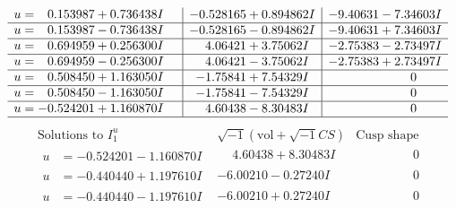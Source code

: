 \documentclass[1p]{elsarticle_modified}
\theoremstyle{definition}
\newcommand{\I}{\sqrt{-1}}
\begin{document}
$$\begin{array}{c|c|c}
\begin{aligned}
u &= \phantom{-}0.153987 + 0.736438 I\end{aligned}
 & -0.528165 + 0.894862 I & -9.40631 - 7.34603 I \\ \hline\begin{aligned}
u &= \phantom{-}0.153987 - 0.736438 I\end{aligned}
 & -0.528165 - 0.894862 I & -9.40631 + 7.34603 I \\ \hline\begin{aligned}
u &= \phantom{-}0.694959 + 0.256300 I\end{aligned}
 & \phantom{-}4.06421 + 3.75062 I & -2.75383 - 2.73497 I \\ \hline\begin{aligned}
u &= \phantom{-}0.694959 - 0.256300 I\end{aligned}
 & \phantom{-}4.06421 - 3.75062 I & -2.75383 + 2.73497 I \\ \hline\begin{aligned}
u &= \phantom{-}0.508450 + 1.163050 I\end{aligned}
 & -1.75841 + 7.54329 I & \phantom{-0.000000 } 0 \\ \hline\begin{aligned}
u &= \phantom{-}0.508450 - 1.163050 I\end{aligned}
 & -1.75841 - 7.54329 I & \phantom{-0.000000 } 0 \\ \hline\begin{aligned}
u &= -0.524201 + 1.160870 I\end{aligned}
 & \phantom{-}4.60438 - 8.30483 I & \phantom{-0.000000 } 0\\
 \hline 
 \end{array}$$\newpage$$\begin{array}{c|c|c}  
\text{Solutions to }I^u_{1}& \I (\text{vol} + \sqrt{-1}CS) & \text{Cusp shape}\\
 \hline 
\begin{aligned}
u &= -0.524201 - 1.160870 I\end{aligned}
 & \phantom{-}4.60438 + 8.30483 I & \phantom{-0.000000 } 0 \\ \hline\begin{aligned}
u &= -0.440440 + 1.197610 I\end{aligned}
 & -6.00210 - 0.27240 I & \phantom{-0.000000 } 0 \\ \hline\begin{aligned}
u &= -0.440440 - 1.197610 I\end{aligned}
 & -6.00210 + 0.27240 I & \phantom{-0.000000 } 0 \\ \hline\begin{aligned}

\end{aligned}
\end{array}$$
\end{document}
